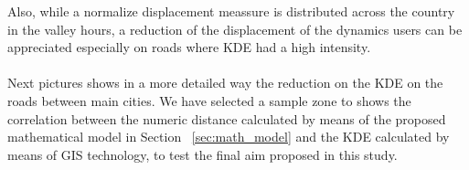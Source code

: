 Also, while a normalize displacement meassure is distributed across the country in the valley hours, a reduction of the displacement of the dynamics users can be appreciated especially on roads where KDE had a high intensity.
\\
\\
Next pictures shows in a more detailed way the reduction on the KDE on the roads between main cities. We have selected a sample zone to shows the correlation between the numeric distance calculated by means of the proposed mathematical model in Section ~\ref{sec:math_model} and the KDE calculated by means of GIS technology, to test the final aim proposed in this study.
\newpage

\begin{figure}
\centering
{}
\end{figure}
